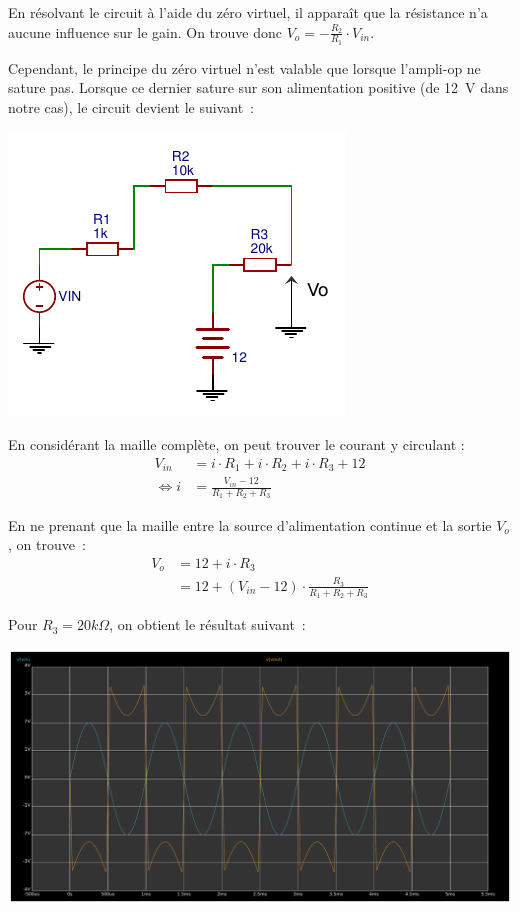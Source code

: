 \documentclass{../template/tp}
\begin{document}
{
	En résolvant le circuit à l'aide du zéro virtuel, il apparaît que la résistance n'a aucune influence sur le gain.
	On trouve donc $V_{o} = - \frac{R_2}{R_1} \cdot V_{in}$.

	Cependant, le principe du zéro virtuel n'est valable que lorsque l'ampli-op ne sature pas.
	Lorsque ce dernier sature sur son alimentation positive (de 12~V dans notre cas), le circuit devient le suivant~:
	\begin{center}
		\includegraphics[scale=1.4]{inverseur-charge-saturation.pdf}
	\end{center}

	En considérant la maille complète, on peut trouver le courant y circulant :
	\begin{align*}
	V_{in} & = i \cdot R_1 + i \cdot R_2 + i \cdot R_3 + 12\\
	\Leftrightarrow i & = \frac{V_{in} - 12}{R_1 + R_2 + R_ 3}
	\end{align*}

	En ne prenant que la maille entre la source d'alimentation continue et la sortie $V_o$, on trouve~:
	\begin{align*}
	V_o & = 12 + i \cdot R_3 \\
	& = 12 + (V_{in} - 12) \cdot \frac{R_3}{R_1 + R_2 + R_ 3}
	\end{align*}

	Pour $R_3 = 20 k\Omega$, on obtient le résultat suivant~:

	\begin{center}
		\includegraphics[width=\textwidth]{inverseur-charge-saturation-waveform.pdf}
	\end{center}
}
\end{document}
